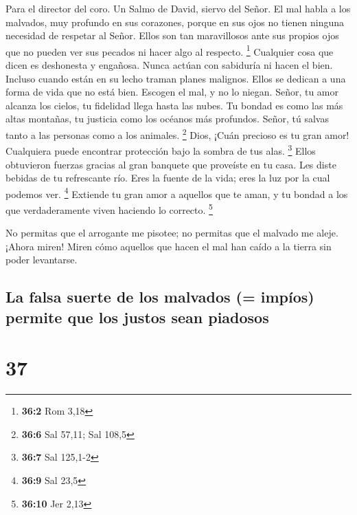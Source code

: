Para el director del coro. Un Salmo de David, siervo del Señor.
 El mal habla a los malvados, muy profundo en sus corazones,
porque en sus ojos no tienen ninguna necesidad de respetar al Señor.
 Ellos son tan maravillosos ante sus propios ojos que no
pueden ver sus pecados ni hacer algo al respecto. \footnote{\textbf{36:2}
  Rom 3,18}  Cualquier cosa que dicen es deshonesta y
engañosa. Nunca actúan con sabiduría ni hacen el bien. 
Incluso cuando están en su lecho traman planes malignos. Ellos se
dedican a una forma de vida que no está bien. Escogen el mal, y no lo
niegan.  Señor, tu amor alcanza los cielos, tu fidelidad
llega hasta las nubes.  Tu bondad es como las más altas
montañas, tu justicia como los océanos más profundos. Señor, tú salvas
tanto a las personas como a los animales. \footnote{\textbf{36:6} Sal
  57,11; Sal 108,5}  Dios, ¡Cuán precioso es tu gran amor!
Cualquiera puede encontrar protección bajo la sombra de tus alas.
\footnote{\textbf{36:7} Sal 125,1-2}  Ellos obtuvieron
fuerzas gracias al gran banquete que proveíste en tu casa. Les diste
bebidas de tu refrescante río.  Eres la fuente de la vida;
eres la luz por la cual podemos ver. \footnote{\textbf{36:9} Sal 23,5}
 Extiende tu gran amor a aquellos que te aman, y tu bondad
a los que verdaderamente viven haciendo lo correcto. \footnote{\textbf{36:10}
  Jer 2,13}

 No permitas que el arrogante me pisotee; no permitas que
el malvado me aleje.  ¡Ahora miren! Miren cómo aquellos que
hacen el mal han caído a la tierra sin poder levantarse.

\hypertarget{la-falsa-suerte-de-los-malvados-impuxedos-permite-que-los-justos-sean-piadosos}{%
\subsection{La falsa suerte de los malvados (= impíos) permite que los
justos sean
piadosos}\label{la-falsa-suerte-de-los-malvados-impuxedos-permite-que-los-justos-sean-piadosos}}

\hypertarget{section-36}{%
\section{37}\label{section-36}}

